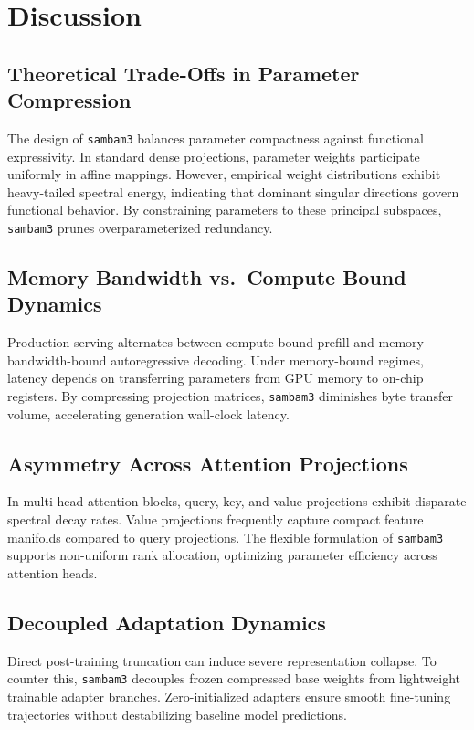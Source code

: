 \section{Discussion}

\subsection{Theoretical Trade-Offs in Parameter Compression}
The design of \texttt{sambam3} balances parameter compactness against functional expressivity. In standard dense projections, parameter weights participate uniformly in affine mappings. However, empirical weight distributions exhibit heavy-tailed spectral energy, indicating that dominant singular directions govern functional behavior. By constraining parameters to these principal subspaces, \texttt{sambam3} prunes overparameterized redundancy.

\subsection{Memory Bandwidth vs.\ Compute Bound Dynamics}
Production serving alternates between compute-bound prefill and memory-bandwidth-bound autoregressive decoding. Under memory-bound regimes, latency depends on transferring parameters from GPU memory to on-chip registers. By compressing projection matrices, \texttt{sambam3} diminishes byte transfer volume, accelerating generation wall-clock latency.

\subsection{Asymmetry Across Attention Projections}
In multi-head attention blocks, query, key, and value projections exhibit disparate spectral decay rates. Value projections frequently capture compact feature manifolds compared to query projections. The flexible formulation of \texttt{sambam3} supports non-uniform rank allocation, optimizing parameter efficiency across attention heads.

\subsection{Decoupled Adaptation Dynamics}
Direct post-training truncation can induce severe representation collapse. To counter this, \texttt{sambam3} decouples frozen compressed base weights from lightweight trainable adapter branches. Zero-initialized adapters ensure smooth fine-tuning trajectories without destabilizing baseline model predictions.

